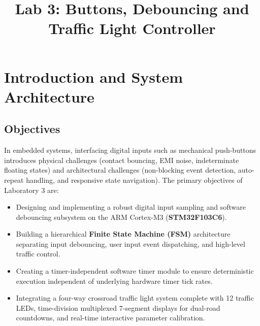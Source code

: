 \documentclass{hcmut-report}
\title{Lab 3: Buttons, Debouncing and Traffic Light Controller}
\begin{document}
\coverpage

\tableofcontents

\newpage

\section{Introduction and System Architecture}

\subsection{Objectives}
In embedded systems, interfacing digital inputs such as mechanical push-buttons introduces physical challenges (contact bouncing, EMI noise, indeterminate floating states) and architectural challenges (non-blocking event detection, auto-repeat handling, and responsive state navigation). The primary objectives of Laboratory 3 are:
\begin{itemize}
    \item Designing and implementing a robust digital input sampling and software debouncing subsystem on the ARM Cortex-M3 (\textbf{STM32F103C6}).
    \item Building a hierarchical \textbf{Finite State Machine (FSM)} architecture separating input debouncing, user input event dispatching, and high-level traffic control.
    \item Creating a timer-independent software timer module to ensure deterministic execution independent of underlying hardware timer tick rates.
    \item Integrating a four-way crossroad traffic light system complete with 12 traffic LEDs, time-division multiplexed 7-segment displays for dual-road countdowns, and real-time interactive parameter calibration.
\end{itemize}
\end{document}
